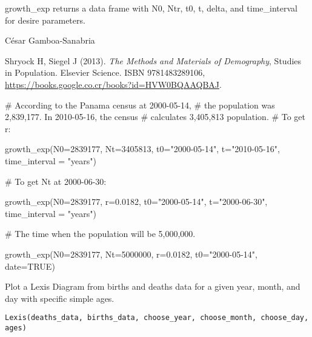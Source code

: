 \documentclass[a4paper]{book}
\begin{document}
\begin{Value}
growth\_exp returns a data frame with N0, Ntr, t0, t, delta, and time\_interval for desire parameters.
\end{Value}
%
\begin{Author}\relax
César Gamboa-Sanabria
\end{Author}
%
\begin{References}\relax
Shryock H, Siegel J (2013).
\emph{The Methods and Materials of Demography},  Studies in Population.
Elsevier Science.
ISBN 9781483289106, \url{https://books.google.co.cr/books?id=HVW0BQAAQBAJ}.
\end{References}
%
\begin{Examples}
\begin{ExampleCode}

# According to the Panama census at 2000-05-14,
# the population was 2,839,177. In 2010-05-16, the census
# calculates 3,405,813 population.
# To get r:

growth_exp(N0=2839177, Nt=3405813, t0="2000-05-14", t="2010-05-16", time_interval = "years")

# To get Nt at 2000-06-30:

growth_exp(N0=2839177, r=0.0182, t0="2000-05-14", t="2000-06-30", time_interval = "years")

# The time when the population will be 5,000,000.

growth_exp(N0=2839177, Nt=5000000, r=0.0182, t0="2000-05-14", date=TRUE)


\end{ExampleCode}
\end{Examples}
%
\begin{Description}\relax
Plot a Lexis Diagram from births and deaths data for a given year, month, and day with specific simple ages.
\end{Description}
%
\begin{Usage}
\begin{verbatim}
Lexis(deaths_data, births_data, choose_year, choose_month, choose_day, ages)
\end{verbatim}
\end{Usage}
%
\end{document}
